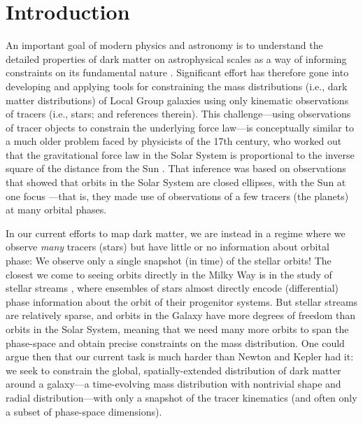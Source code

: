 \documentclass[modern]{aastex63}
\begin{document}
\section{Introduction}
\label{sec:intro}

An important goal of modern physics and astronomy is to understand the detailed
properties of dark matter on astrophysical scales as a way of informing
constraints on its fundamental nature \citep[see, e.g., recent reviews
by][]{Bullock:2017, Buckley:2018}.
Significant effort has therefore gone into developing and applying tools for
constraining the mass distributions (i.e., dark matter distributions) of Local
Group galaxies using only kinematic observations of tracers (i.e., stars;
\citealt{Jeans:1919b, Binney:2008} and references therein).
This challenge---using observations of tracer objects to constrain the
underlying force law---is conceptually similar to a much older problem faced by
physicists of the 17th century, who worked out that the gravitational force law
in the Solar System is proportional to the inverse square of the distance from
the Sun \citep{Newton:1687}.
That inference was based on observations that showed that orbits in the Solar
System are closed ellipses, with the Sun at one focus \citep{Kepler:1609}---that
is, they made use of observations of a few tracers (the planets) at many orbital
phases.

In our current efforts to map dark matter, we are instead in a regime where we
observe \emph{many} tracers (stars) but have little or no information about
orbital phase: We observe only a single snapshot (in time) of the stellar
orbits!
The closest we come to seeing orbits directly in the Milky Way is in the study
of stellar streams \citep[e.g.,][]{Johnston:1999, Helmi:1999, Eyre:2011,
Sanders:2013, Price-Whelan:2014}, where ensembles of stars almost directly
encode (differential) phase information about the orbit of their progenitor
systems.
But stellar streams are relatively sparse, and orbits in the Galaxy have more
degrees of freedom than orbits in the Solar System, meaning that we need many
more orbits to span the phase-space and obtain precise constraints on the mass
distribution.
One could argue then that our current task is much harder than Newton and Kepler
had it:
we seek to constrain the global, spatially-extended distribution of dark matter
around a galaxy---a time-evolving mass distribution with nontrivial shape and
radial distribution---with only a snapshot of the tracer kinematics (and often
only a subset of phase-space dimensions).
\end{document}
